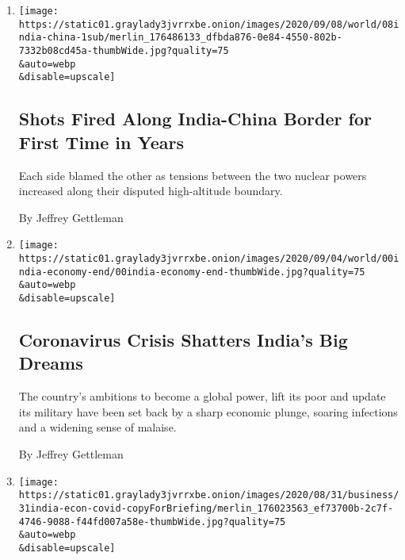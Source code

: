 \begin{enumerate}
\def\labelenumi{\arabic{enumi}.}
\item
  \href{/2020/09/08/world/asia/india-china-border.html}{}

  \texttt{[image: https://static01.graylady3jvrrxbe.onion/images/2020/09/08/world/08india-china-1sub/merlin\_176486133\_dfbda876-0e84-4550-802b-7332b08cd45a-thumbWide.jpg?quality=75\\\&auto=webp\\\&disable=upscale]}

  \hypertarget{shots-fired-along-india-china-border-for-first-time-in-years}{%
  \subsection{Shots Fired Along India-China Border for First Time in
  Years}\label{shots-fired-along-india-china-border-for-first-time-in-years}}

  Each side blamed the other as tensions between the two nuclear powers
  increased along their disputed high-altitude boundary.

  By Jeffrey Gettleman
\item
  \href{/2020/09/05/world/asia/india-economy-coronavirus.html}{}

  \texttt{[image: https://static01.graylady3jvrrxbe.onion/images/2020/09/04/world/00india-economy-end/00india-economy-end-thumbWide.jpg?quality=75\\\&auto=webp\\\&disable=upscale]}

  \hypertarget{coronavirus-crisis-shatters-indias-big-dreams}{%
  \subsection{Coronavirus Crisis Shatters India's Big
  Dreams}\label{coronavirus-crisis-shatters-indias-big-dreams}}

  The country's ambitions to become a global power, lift its poor and
  update its military have been set back by a sharp economic plunge,
  soaring infections and a widening sense of malaise.

  By Jeffrey Gettleman
\item
  \href{/live/2020/08/31/business/stock-market-today-coronavirus/indias-24-percent-decline-in-gdp-last-quarter-was-the-worst-of-any-major-economy}{}

  \texttt{[image: https://static01.graylady3jvrrxbe.onion/images/2020/08/31/business/31india-econ-covid-copyForBriefing/merlin\_176023563\_ef73700b-2c7f-4746-9088-f44fd007a58e-thumbWide.jpg?quality=75\\\&auto=webp\\\&disable=upscale]}


\end{enumerate}
